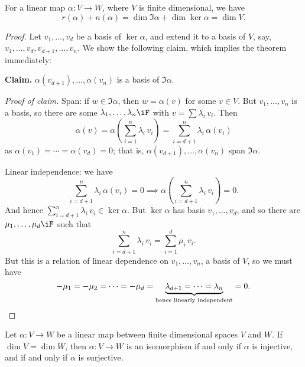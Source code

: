 \begin{theorem}
	 For a linear map $\alpha:V\to W$, where $V$ is finite dimensional, we have %
	\begin{equation*}
		r(\alpha) + n(\alpha) = \dim \Im \alpha + \dim \ker \alpha = \dim V.
	\end{equation*}
\end{theorem}

\begin{proof}
	Let $v_1,\ldots,v_d$ be a basis of $\ker\alpha$, and extend it to a basis of $V$, say, $v_1,\ldots,v_d,v_{d+1},\ldots,v_n$. We show the following claim, which implies the theorem immediately: %
	
	\textbf{Claim.} $\alpha(v_{d+1}),\ldots,\alpha(v_n)$ is a basis of $\Im\alpha$. %
	
	\emph{Proof of claim.} Span: if $w\in\Im\alpha$, then $w=\alpha(v)$ for some $v\in V$. But $v_1,\ldots,v_n$ is a basis, so there are some $\lambda_1,\ldots,\lambda_n\iF$ with $v=\sum \lambda_i \,v_i$. Then %
	\begin{equation*}
		\alpha(v)
		= \alpha\left( \sum_{i=1}^n \lambda_i \, v_i \right)
		= \sum_{i=d+1}^n \lambda_i \, \alpha(v_i)
	\end{equation*}
	as $\alpha(v_1)=\cdots=\alpha(v_d)=0$; that is, $\alpha(v_{d+1}),\ldots,\alpha(v_n)$ span $\Im\alpha$. %
	
	Linear independence: we have
	\begin{equation*}
		\sum_{i=d+1}^n \lambda_i\,\alpha(v_i) = 0
		\implies
		\alpha\left( \sum_{i=d+1}^n \lambda_i \, v_i \right) = 0.
	\end{equation*}
	And hence $\sum_{i=d+1}^n \lambda_i\,v_i \in \ker\alpha$. But $\ker\alpha$ has basis $v_1,\ldots,v_d$, and so there are $\mu_1,\ldots,\mu_d\iF$ such that %
	\begin{equation*}
		\sum_{i=d+1}^n \lambda_i\,v_i = \sum_{i=1}^d \mu_i\,v_i.
	\end{equation*}
	But this is a relation of linear dependence on $v_1,\ldots,v_n$, a basis of $V$, so we must have %
	\begin{equation*}
		-\mu_1 = -\mu_2 = \cdots = -\mu_d = \underbrace{\lambda_{d+1} = \cdots = \lambda_n}_\text{hence linearly independent} = 0. \qedhere %
	\end{equation*}
\end{proof}

\begin{corollary}
	Let $\alpha:V\to W$ be a linear map between finite dimensional spaces $V$ and $W$. If $\dim V=\dim W$, then $\alpha:V\to W$ is an isomorphism if and only if $\alpha$ is injective, and if and only if $\alpha$ is surjective. %
\end{corollary}

